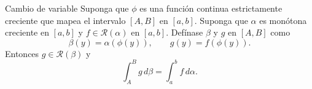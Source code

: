 \documentclass[10pt]{beamer}
\begin{document}
\begin{frame}
\begin{theorem}[13]{Cambio de variable}
Suponga que $\phi$ es una función continua estrictamente creciente que mapea el intervalo $[A, B]$ en $[a, b]$. Suponga que $\alpha$ es monótona creciente en $[a, b]$ y $f \in \mathcal{R}(\alpha)$ en $[a, b]$. Defínase $\beta$ y $g$ en $[A, B]$ como
\begin{equation}
	\beta(y) = \alpha(\phi(y)), \qquad g(y) = f(\phi(y)).
\end{equation}
Entonces $g \in \mathcal{R}(\beta)$ y
\begin{equation}
	\int_A^B g\,d\beta = \int_a^b f\,d\alpha.
\end{equation}
\end{theorem}

\end{frame}
\end{document}
